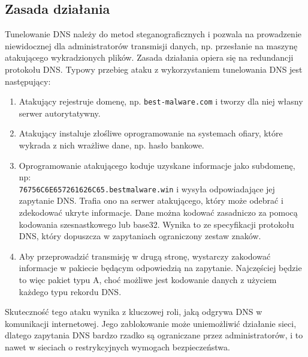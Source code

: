 \documentclass{eiti-raport}
\begin{document}
\subsection{Zasada działania} \label{sec:tunelowanie}
Tunelowanie DNS należy do metod steganograficznych i pozwala na prowadzenie niewidocznej dla administratorów transmisji danych, np. przesłanie na maszynę atakującego wykradzionych plików. Zasada działania opiera się na redundancji protokołu DNS. Typowy przebieg ataku z wykorzystaniem tunelowania DNS jest następujący:
\begin{enumerate}
	\item Atakujący rejestruje domenę, np. \texttt{best-malware.com} i tworzy dla niej własny serwer autorytatywny. 
	\item Atakujący instaluje złośliwe oprogramowanie na systemach ofiary, które wykrada z nich wrażliwe dane, np. hasło bankowe. 
	\item Oprogramowanie atakującego koduje uzyskane informacje jako subdomenę, np: \\  \texttt{76756C6E657261626C65.bestmalware.win} i wysyła odpowiadające jej zapytanie DNS. Trafia ono na serwer atakującego, który może odebrać i zdekodować ukryte informacje. Dane można kodować zasadniczo za pomocą kodowania szesnastkowego lub base32. Wynika to ze specyfikacji protokołu DNS, który dopuszcza w zapytaniach ograniczony zestaw znaków. 
	\item Aby przeprowadzić transmisję w drugą stronę, wystarczy zakodować informacje w pakiecie będącym odpowiedzią na zapytanie. Najczęściej będzie to więc pakiet typu A, choć możliwe jest kodowanie danych z użyciem każdego typu rekordu DNS. 
\end{enumerate}
Skuteczność tego ataku wynika z kluczowej roli, jaką odgrywa DNS w komunikacji internetowej. Jego zablokowanie może uniemożliwić działanie sieci, dlatego zapytania DNS bardzo rzadko są ograniczane przez administratorów, i to nawet w sieciach o restrykcyjnych wymogach bezpieczeństwa. 
\end{document}
